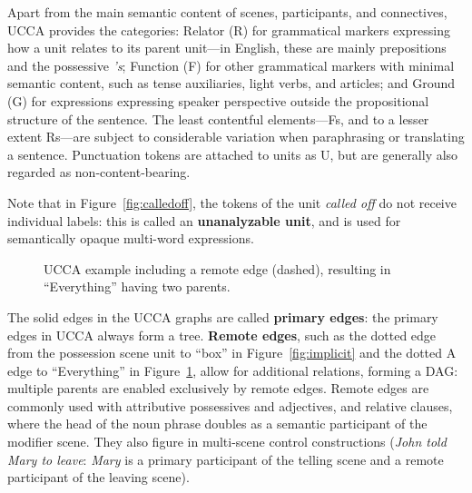 \documentclass[12pt,a4paper,table]{report}
\begin{document}
Apart from the main semantic content of scenes, participants, and connectives, UCCA provides the categories: Relator (R) for grammatical markers expressing how a unit relates to its parent unit---in English, these are mainly prepositions and the possessive \textit{'s}; Function (F) for other grammatical markers with minimal semantic content, such as tense auxiliaries, light verbs, and articles; and Ground (G) for expressions expressing speaker perspective outside the propositional structure of the sentence.
The least contentful elements---Fs, and to a lesser extent Rs---are subject to considerable variation when paraphrasing or translating a sentence.
Punctuation tokens are attached to units as U, but are generally also regarded as non-content-bearing.

Note that in Figure~\ref{fig:calledoff}, the tokens of the unit \textit{called off} do not receive individual labels: this is called an \textbf{unanalyzable unit}, and is used for semantically opaque multi-word expressions.

\begin{figure}[ht]\small\centering
\caption{
    UCCA example including a remote edge (dashed),
    resulting in ``Everything'' having two parents.}\label{fig:remote}
\end{figure}

The solid edges in the UCCA graphs are called \textbf{primary edges}: the primary edges in UCCA always form a tree. 
\textbf{Remote edges}, such as the dotted edge from the possession scene unit to ``box'' in Figure~\ref{fig:implicit}
and the dotted A edge to ``Everything'' in Figure~\ref{fig:remote}, allow for additional relations, forming a DAG:
multiple parents are enabled exclusively by remote edges.
Remote edges are commonly used with attributive possessives and adjectives, and relative clauses, where the head of the noun phrase doubles as a semantic participant of the modifier scene. 
They also figure in multi-scene control constructions (\textit{John told Mary to leave}: \textit{Mary} is a primary participant of the telling scene and a remote participant of the leaving scene).
\end{document}
